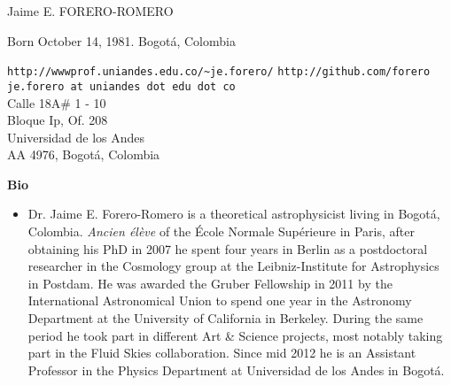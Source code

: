 \documentclass[11pt]{article}
\begin{document}
\noindent

\noindent
{{\Large Jaime E. FORERO-ROMERO}}\\
\begin{flushleft}
Born October 14, 1981. Bogot\'a, Colombia\\
\end{flushleft}
\begin{flushright}
\verb"http://wwwprof.uniandes.edu.co/~je.forero/" 
\verb"http://github.com/forero"\\
\verb"je.forero at uniandes dot edu dot co"\\
Calle 18A\# 1 - 10\\
Bloque Ip, Of. 208\\
Universidad de los Andes\\
AA 4976, Bogot\'a, Colombia\\
\end{flushright}
\vspace{1cm}


{\bf Bio}
\begin{itemize}
\item[]Dr. Jaime E. Forero-Romero is a theoretical astrophysicist living in
Bogot\'a, Colombia. {\textit{Ancien \'el\`eve}} of the \'Ecole Normale
Sup\'erieure in Paris, after obtaining his PhD in 2007 he spent four
years in Berlin as a postdoctoral researcher in the Cosmology group at
the Leibniz-Institute for Astrophysics in Postdam. He was awarded
the Gruber Fellowship in 2011 by the International Astronomical Union
to spend one year in the Astronomy Department at the University of
California in Berkeley. During the same period he took part in different
Art \& Science projects, most notably taking part in the Fluid Skies
collaboration. Since mid 2012 he is an Assistant Professor in the
Physics Department at Universidad de los Andes in Bogot\'a. 
\end{itemize}

\vspace{1cm}
\end{document}
